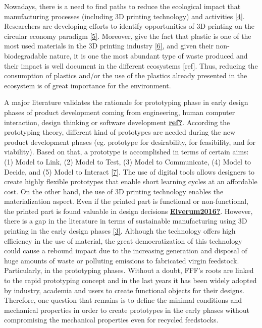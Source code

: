 \documentclass[conference,final,]{IEEEtran}
\begin{document}
Nowadays, there is a need to find paths to reduce the ecological impact
that manufacturing processes (including 3D printing technology) and
activities \protect\hyperlink{ref-Niaki2019}{{[}4{]}}. Researchers are
developing efforts to identify opportunities of 3D printing on the
circular economy paradigm
\protect\hyperlink{ref-Despeisse2016}{{[}5{]}}. Moreover, give the fact
that plastic is one of the most used materials in the 3D printing
industry \protect\hyperlink{ref-GonzalezHenriquez2019}{{[}6{]}}, and
given their non-biodegradable nature, it is one the most abundant type
of waste produced and their impact is well document in the different
ecosystems {[}ref{]}. Thus, reducing the consumption of plastics and/or
the use of the plastics already presented in the ecosystem is of great
importance for the environment.

A major literature validates the rationale for prototyping phase in
early design phases of product development coming from engineering,
human computer interaction, design thinking or software development
\protect\hyperlink{ref-ref}{\textbf{ref?}}. According the prototyping
theory, different kind of prototypes are needed during the new product
development phases (eg. prototype for desirability, for feasibility, and
for viability). Based on that, a prototype is accomplished in terms of
certain aims: (1) Model to Link, (2) Model to Test, (3) Model to
Communicate, (4) Model to Decide, and (5) Model to Interact
\protect\hyperlink{ref-Menold2017}{{[}7{]}}. The use of digital tools
allows designers to create highly flexible prototypes that enable short
learning cycles at an affordable cost. On the other hand, the use of 3D
printing technology enables the materialization aspect. Even if the
printed part is functional or non-functional, the printed part is found
valuable in design decisions
\protect\hyperlink{ref-Elverum2016}{\textbf{Elverum2016?}}. However,
there is a gap in the literature in terms of sustainable manufacturing
using 3D printing in the early design phases
\protect\hyperlink{ref-Peng2018}{{[}3{]}}. Although the technology
offers high efficiency in the use of material, the great democratization
of this technology could cause a rebound impact due to the increasing
generation and disposal of huge amounts of waste or polluting emissions
to fabricated virgin feedstock. Particularly, in the prototyping phases.
Without a doubt, FFF's roots are linked to the rapid prototyping concept
and in the last years it has been widely adopted by industry, academia
and users to create functional objects for their designs. Therefore, one
question that remains is to define the minimal conditions and mechanical
properties in order to create prototypes in the early phases without
compromising the mechanical properties even for recycled feedstocks.
\end{document}
